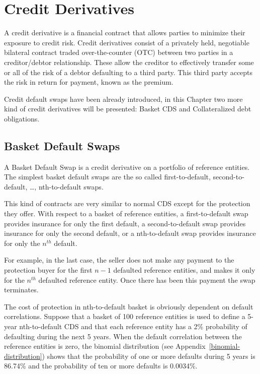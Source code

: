 \chapter{Credit Derivatives}

A credit derivative is a financial contract that allows parties to minimize their exposure to credit risk. Credit derivatives consist of a privately held, negotiable bilateral contract traded over-the-counter (OTC) between two parties in a creditor/debtor relationship. These allow the creditor to effectively transfer some or all of the risk of a debtor defaulting to a third party. This third party accepts the risk in return for payment, known as the premium.

Credit default swaps have been already introduced, in this Chapter two more kind of credit derivatives will be presented: Basket CDS and Collateralized debt obligations.

\section{Basket Default Swaps}\label{basket-default-swaps}

A Basket Default Swap is a credit derivative on a portfolio of reference entities. The simplest basket default swaps are the so called first-to-default, second-to-default, \ldots, nth-to-default swaps. 

This kind of contracts are very similar to normal CDS except for the protection they offer. With respect to a basket of reference entities, a first-to-default swap provides insurance for only the first default, a second-to-default swap provides insurance for only the second default, or a nth-to-default swap provides insurance for only the $n^{th}$ default. 

For example, in the last case, the seller does not make any payment to the protection buyer for the first $n-1$ defaulted reference entities, and makes it only for the $n^{th}$ defaulted reference entity. Once there has been this payment the swap terminates.

The cost of protection in nth-to-default basket is obviously dependent on default correlations. Suppose that a basket of 100 reference entities is used to define a 5-year nth-to-default CDS and that each reference entity has a 2\% probability of defaulting during the next 5 years. When the default correlation between the reference entities is zero, the binomial distribution (see Appendix~\ref{binomial-distribution}) shows that the probability of one or more defaults during 5 years is 86.74\% and the probability of ten or more defaults is 0.0034\%.

